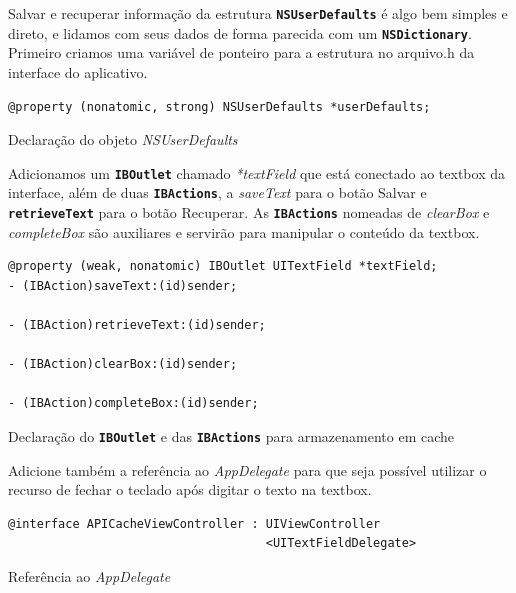\documentclass[a4paper,12pt,brazil,doubleside]{book}
\begin{document}
\begin{singlespace}
Salvar e recuperar informação da estrutura \texttt{\textbf{NSUserDefaults}} é algo bem simples e direto, e lidamos com seus dados de forma parecida com um \texttt{\textbf{NSDictionary}}. Primeiro criamos uma variável de ponteiro para a estrutura no arquivo.h da interface do aplicativo.

\begin{listing}[H]
\begin{verbatim}
@property (nonatomic, strong) NSUserDefaults *userDefaults;
\end{verbatim}
\caption{Declaração do objeto \emph{NSUserDefaults}}
\end{listing}


Adicionamos um \texttt{\textbf{IBOutlet}} chamado \emph{*textField} que está conectado ao textbox da interface, além de duas \texttt{\textbf{IBActions}}, a \emph{saveText} para o botão Salvar e \texttt{\textbf{retrieveText}} para o botão Recuperar.
As \texttt{\textbf{IBActions}} nomeadas de \emph{clearBox} e \emph{completeBox} são auxiliares e servirão para manipular o conteúdo da textbox.

\begin{listing}[H]
\begin{verbatim}
@property (weak, nonatomic) IBOutlet UITextField *textField;
- (IBAction)saveText:(id)sender;

- (IBAction)retrieveText:(id)sender;

- (IBAction)clearBox:(id)sender;

- (IBAction)completeBox:(id)sender;
\end{verbatim}
\caption{Declaração do \texttt{\textbf{IBOutlet}} e das \texttt{\textbf{IBActions}} para armazenamento em cache}
\end{listing}


Adicione também a referência ao \emph{AppDelegate} para que seja possível utilizar o recurso de fechar o teclado após digitar o texto na textbox.

\begin{listing}[H]
\begin{verbatim}
@interface APICacheViewController : UIViewController 
									<UITextFieldDelegate>
\end{verbatim}
\caption{Referência ao \emph{AppDelegate}}
\end{listing}


\end{singlespace}
\end{document}
